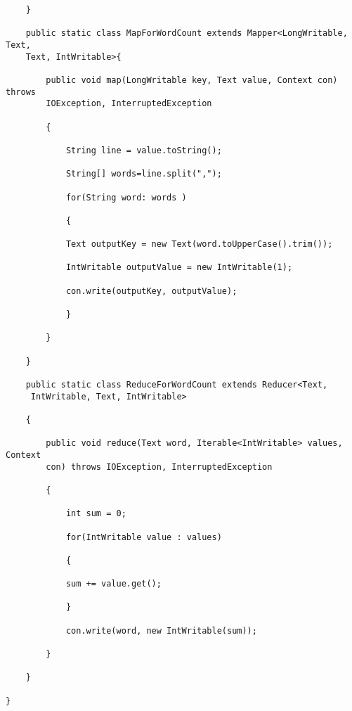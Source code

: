 \begin{lstlisting}
	}
	
	public static class MapForWordCount extends Mapper<LongWritable, Text, 
	Text, IntWritable>{
	
		public void map(LongWritable key, Text value, Context con) throws 
		IOException, InterruptedException
		
		{
		
			String line = value.toString();
			
			String[] words=line.split(",");
			
			for(String word: words )
			
			{
			
			Text outputKey = new Text(word.toUpperCase().trim());
			
			IntWritable outputValue = new IntWritable(1);
			
			con.write(outputKey, outputValue);
			
			}
		
		}
	
	}
	
	public static class ReduceForWordCount extends Reducer<Text,
	 IntWritable, Text, IntWritable>
	
	{
	
		public void reduce(Text word, Iterable<IntWritable> values, Context 
		con) throws IOException, InterruptedException
		
		{
		
			int sum = 0;
			
			for(IntWritable value : values)
			
			{
			
			sum += value.get();
			
			}
			
			con.write(word, new IntWritable(sum));
		
		}
	
	}

}
\end{lstlisting} 